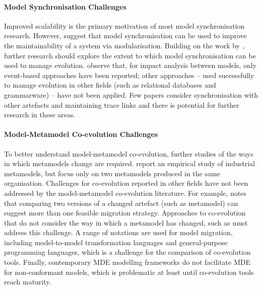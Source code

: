 \paragraph{Model Synchronisation Challenges} Improved scalability is the primary motivation of most model synchronisation research. However, \cite{fritzsche08tracing} suggest that model synchronisation can be used to improve the maintainability of a system via modularisation. Building on the work by \cite{fritzsche08tracing}, further research should explore the extent to which model synchronisation can be used to manage evolution. \cite{winkler09survey} observe that, for impact analysis between models, only event-based approaches have been reported; other approaches -- used successfully to manage evolution in other fields (such as relational databases and grammarware) -- have not been applied. Few papers consider synchronisation with other artefacts and maintaining trace links and there is potential for further research in these areas.

\paragraph{Model-Metamodel Co-evolution Challenges} To better understand model-metamodel co-evolution, further studies of the ways in which metamodels change are required. \cite{herrmannsdoerfer08automatability} report an empirical study of industrial metamodels, but focus only on two metamodels produced in the same organisation. Challenges for co-evolution reported in other fields have not been addressed by the model-metamodel co-evolution literature. For example, \cite{lerner00model} notes that comparing two versions of a changed artefact (such as metamodel) can suggest more than one feasible migration strategy. Approaches to co-evolution that do not consider the way in which a metamodel has changed, such as \cite{cicchetti08automating,garces09managing} must address this challenge. A range of notations are used for model migration, including model-to-model transformation languages and general-purpose programming languages, which is a challenge for the comparison of co-evolution tools. Finally, contemporary MDE modelling frameworks do not facilitate MDE for non-conformant models, which is problematic at least until co-evolution tools reach maturity.  

